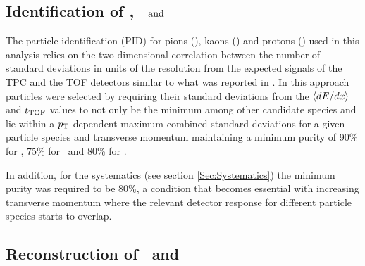 \subsection{Identification of \pion, \kaon~$\rm{and}$ \proton}
\label{SubSec:Identification}
The particle identification (PID) for pions (\pion), kaons (\kaon) and protons (\proton) used in this analysis relies on the two-dimensional correlation between the number of standard deviations in units of the resolution from the expected signals of the TPC and the TOF detectors similar to what was reported in \cite{Abelev:2014pua,Adam:2016nfo,Acharya:2018zuq}. In this approach particles were selected by requiring their standard deviations from the $\langle d{\it E}/d{\it x}\rangle$ and $t_{\rm TOF}$ values to not only be the minimum among other candidate species and lie within a $p_{\rm T}$-dependent maximum combined standard deviations for a given particle species and transverse momentum maintaining a minimum purity of 90\% for \pion, 75\% for \kaon~and 80\% for \proton. 


In addition, for the systematics (see section \ref{Sec:Systematics}) the minimum purity was required to be 80\%, a condition that becomes essential with increasing transverse momentum where the relevant detector response for different particle species starts to overlap.

\subsection{Reconstruction of \Ks~and \lambdas}
\label{SubSec:K0sLambdaRec}


